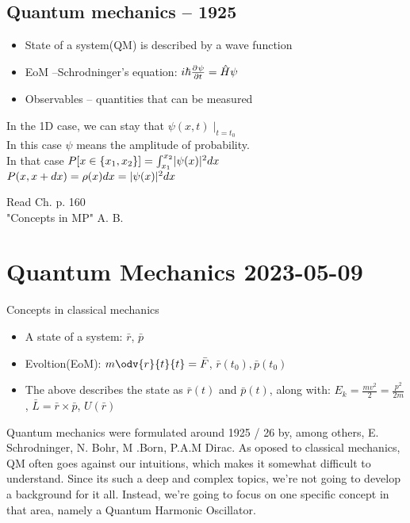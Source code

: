 \section{Quantum mechanics -- 1925}

\begin{itemize}
        \item State of a system(QM) is described by a wave function
        \item EoM --Schrodninger's equation: $i\hbar \frac{\partial^{}\psi}{\partial t^{}} = \hat{H}\psi$
        \item Observables -- quantities that can be measured
\end{itemize}



{
    In the 1D case, we can stay that $ \psi(x,t)\mid_{t=t_0}$\\
    In this case $\psi $ means the amplitude of probability.\\
    In that case $P[x \in \{x_1,x_2\}] = \int_{x_1}^{x_2} \lvert\psi(x)\rvert^2 dx$\\
    $P(x,x+dx) = \rho(x)dx = \lvert\psi(x)\rvert^2dx$
}

{
    Read Ch.  p. 160\\
    "Concepts in MP" A. B.
}

\chapter{Quantum Mechanics 2023-05-09}

{
    Concepts in classical mechanics
    \begin{itemize}
            \item A state of a system: $\bar{r}$, $\bar{p}$ 
            \item Evoltion(EoM): $m \odv{r}{t}{t} = \bar{F}$, $\bar{r}(t_0), \bar{p}(t_0)$
            \item The above describes the state as $\bar{r}(t)$ and $\bar{p}(t)$, along with: $E_k=\frac{mv^{2}}{2} = \frac{p^{2}}{2m}$, $\bar{L}=\bar{r}\times \bar{p}$, $U(\bar{r})$
            
    \end{itemize}
}
{   Quantum mechanics were formulated around 1925 / 26 by, among others, E. Schrodninger, N. Bohr, M .Born, P.A.M Dirac.
    As oposed to classical mechanics, QM often goes against our intuitions, which makes it somewhat difficult to understand.
    Since its such a deep and complex topics, we're not going to develop a background for it all. Instead, we're going to
    focus on one specific concept in that area, namely a Quantum Harmonic Oscillator.
}

